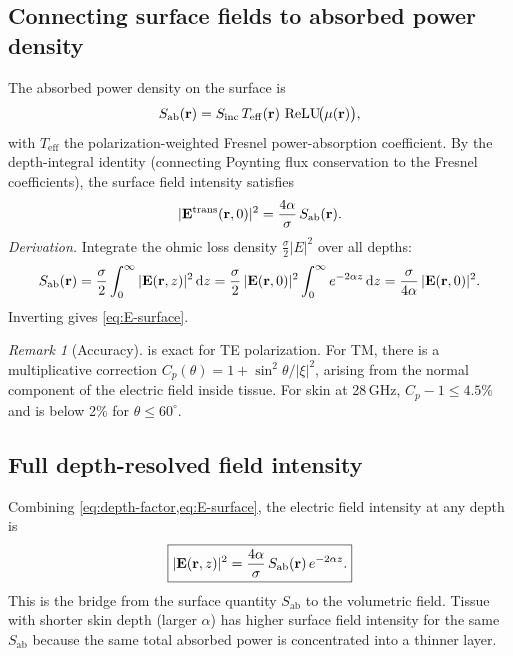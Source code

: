 \documentclass[11pt,a4paper]{article}
\theoremstyle{definition}
\theoremstyle{remark}
\newtheorem{remark}[theorem]{Remark}
\newcommand{\Sab}{S_{\mathrm{ab}}}
\newcommand{\Sinc}{S_{\mathrm{inc}}}
\newcommand{\ReLU}{\operatorname{ReLU}}
\begin{document}
\subsection{Connecting surface fields to absorbed power density}

The absorbed power density on the surface is
\begin{equation}\label{eq:Sab}
  \Sab(\vb{r}) = \Sinc\,T_{\mathrm{eff}}(\vb{r})\,\ReLU\!\bigl(\mu(\vb{r})\bigr),
\end{equation}
with $T_{\mathrm{eff}}$ the polarization-weighted Fresnel power-absorption
coefficient. By the depth-integral identity (connecting Poynting flux conservation
to the Fresnel coefficients), the surface field intensity satisfies
\begin{equation}\label{eq:E-surface}
  |\vb{E}^{\mathrm{trans}}(\vb{r}, 0)|^2
  = \frac{4\alpha}{\sigma}\,\Sab(\vb{r}).
\end{equation}
\emph{Derivation.} Integrate the ohmic loss density $\frac{\sigma}{2}|E|^2$
over all depths:
\[
  \Sab(\vb{r})
  = \frac{\sigma}{2}\int_0^\infty |\vb{E}(\vb{r},z)|^2\,\mathrm{d}z
  = \frac{\sigma}{2}\,|\vb{E}(\vb{r},0)|^2 \int_0^\infty e^{-2\alpha z}\,\mathrm{d}z
  = \frac{\sigma}{4\alpha}\,|\vb{E}(\vb{r},0)|^2.
\]
Inverting gives \cref{eq:E-surface}.

\begin{remark}[Accuracy]
 is exact for TE polarization. For TM, there is a
multiplicative correction $C_p(\theta) = 1 + \sin^2\theta/|\xi|^2$, arising
from the normal component of the electric field inside tissue. For skin at
28\,GHz, $C_p - 1 \leq 4.5$\% and is below 2\% for $\theta \leq 60^\circ$.
\end{remark}

\subsection{Full depth-resolved field intensity}

Combining \cref{eq:depth-factor,eq:E-surface}, the electric field intensity at
any depth is
\begin{equation}\label{eq:E-depth}
  \boxed{%
    |\vb{E}(\vb{r}, z)|^2
    = \frac{4\alpha}{\sigma}\,\Sab(\vb{r})\,e^{-2\alpha z}.
  }
\end{equation}
This is the bridge from the surface quantity $\Sab$ to the volumetric field.
Tissue with shorter skin depth (larger $\alpha$) has higher surface field
intensity for the same $\Sab$ because the same total absorbed power is
concentrated into a thinner layer.
\end{document}
